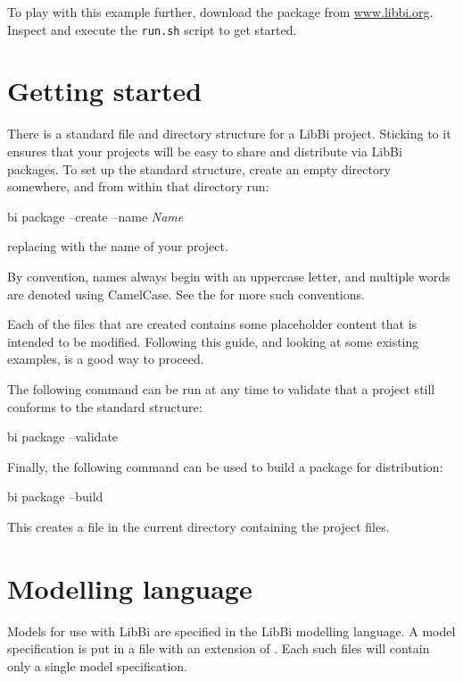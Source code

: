To play with this example further, download the  package from
\url{www.libbi.org}. Inspect and execute the \texttt{run.sh} script to get
started.

\section{Getting started}\label{Getting_started}

There is a standard file and directory structure for a LibBi project. Sticking
to it ensures that your projects will be easy to share and distribute via
LibBi packages. To set up the standard structure, create an empty directory
somewhere, and from within that directory run:
\begin{cmdcode}
bi package --create --name \emph{Name}
\end{cmdcode}
replacing  with the name of your project.

\begin{tip}
By convention, names always begin with an uppercase letter, and multiple words
are denoted using CamelCase. See the  for
more such conventions.
\end{tip}

Each of the files that are created contains some placeholder content that is
intended to be modified. Following this guide, and looking at some existing
examples, is a good way to proceed.

The following command can be run at any time to validate that a project still
conforms to the standard structure:
\begin{cmdcode}
bi package --validate
\end{cmdcode}

Finally, the following command can be used to build a package for
distribution:
\begin{cmdcode}
bi package --build
\end{cmdcode}
This creates a  file in the current directory containing the
project files.

\section{Modelling language\label{Modelling_language}}

Models for use with LibBi are specified in the LibBi modelling language. A
model specification is put in a file with an extension of . Each
such files will contain only a single model specification.

